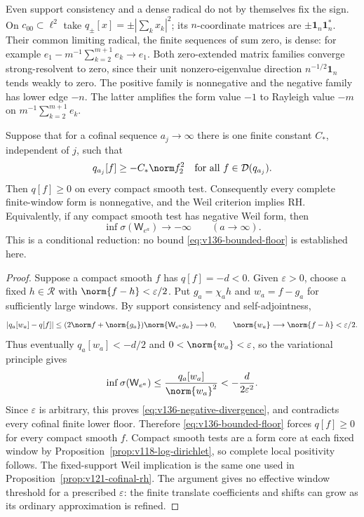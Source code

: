 Even support consistency and a dense radical do not by themselves
fix the sign. On $c_{00}\subset\ell^2$ take
$q_\pm[x]=\pm|\sum_kx_k|^2$; its $n$-coordinate matrices are
$\pm\mathbf1_n\mathbf1_n^*$. Their common limiting radical,
the finite sequences of sum zero, is dense: for example
$e_1-m^{-1}\sum_{k=2}^{m+1}e_k\to e_1$.
Both zero-extended matrix families converge strong-resolvent to zero,
since their unit nonzero-eigenvalue direction
$n^{-1/2}\mathbf1_n$ tends weakly to zero. The positive family is
nonnegative and the negative family has lower edge $-n$.
The latter amplifies the form value $-1$ to Rayleigh value $-m$
on $m^{-1}\sum_{k=2}^{m+1}e_k$.

\begin{proposition}
\label{prop:v136-bounded-floor}
Suppose that for a cofinal sequence $a_j\to\infty$ there is one
finite constant $C_*$, independent of $j$, such that
\begin{equation}\label{eq:v136-bounded-floor}
 q_{a_j}[f]\ge-C_*\norm f_2^2
 \quad\hbox{for all }f\in\mathcal D(q_{a_j}).
\end{equation}
Then $q[f]\ge0$ on every compact smooth test. Consequently every
complete finite-window form is nonnegative, and the Weil criterion
implies RH. Equivalently, if any compact smooth test has negative
Weil form, then
\begin{equation}\label{eq:v136-negative-divergence}
 \inf\sigma(\mathsf W_{e^a})\longrightarrow-\infty
 \qquad(a\longrightarrow\infty).
\end{equation}
This is a conditional reduction: no bound \eqref{eq:v136-bounded-floor}
is established here.
\end{proposition}
\begin{proof}
Suppose a compact smooth $f$ has $q[f]=-d<0$. Given $\varepsilon>0$,
choose a fixed $h\in\mathcal R$ with $\norm{f-h}<\varepsilon/2$.
Put $g_a=\chi_a h$ and $w_a=f-g_a$ for sufficiently large windows.
By support consistency and self-adjointness,
\[
 |q_a[w_a]-q[f]|
 \le (2\norm f+\norm{g_a})\norm{\mathsf W_{e^a}g_a}
 \longrightarrow0,\qquad
 \norm{w_a}\longrightarrow\norm{f-h}<\varepsilon/2.
\]
Thus eventually $q_a[w_a]<-d/2$ and $0<\norm{w_a}<\varepsilon$,
so the variational principle gives
\begin{equation}\label{eq:v136-negative-amplification}
 \inf\sigma(\mathsf W_{e^a})
 \le\frac{q_a[w_a]}{\norm{w_a}^2}
 <-\frac{d}{2\varepsilon^2}.
\end{equation}
Since $\varepsilon$ is arbitrary, this proves
\eqref{eq:v136-negative-divergence}, and contradicts every cofinal
finite lower floor. Therefore \eqref{eq:v136-bounded-floor} forces
$q[f]\ge0$ for every compact smooth $f$.
Compact smooth tests are a form core at each fixed window by
Proposition~\ref{prop:v118-log-dirichlet}, so complete local
positivity follows. The fixed-support Weil implication is the same
one used in Proposition~\ref{prop:v121-cofinal-rh}.
The argument gives no effective window threshold for a prescribed
$\varepsilon$: the finite translate coefficients and shifts can grow
as its ordinary approximation is refined.
\end{proof}


